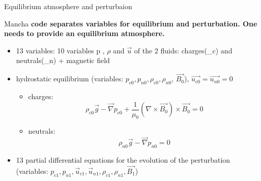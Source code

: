 \documentclass{beamer}
\begin{document}
\begin{frame}{Equilibrium atmosphere and perturbaion}


{\sc Mancha} {\bf code separates variables for equilibrium and perturbation. 
One needs to provide an equilibrium atmosphere.}


\begin{itemize}
\item 13 variables: 10 variables p , $\rho$ and $\vec{u}$ of the 2 fluids: charges(\_c) and neutrals(\_n) + magnetic field
\item hydrostatic equilibrium (variables: $p_{c0}, p_{n0}, \rho_{c0}, \rho_{n0}$, $\vec{B_0}$), $\vec{u_{c0}}=\vec{u_{n0}}=0$
 
\begin{itemize}
\item charges:
\begin{equation}
\rho_{c0}\vec{g} - \vec{\nabla} p_{c0} + \frac{1}{\mu_0} (\nabla \times \vec{B_0}) \times \vec{B_0} = 0
\end{equation}

\item neutrals:
\begin{equation}
\rho_{n0}\vec{g} - \vec{\nabla} p_{n0}  = 0
\end{equation}

\end{itemize}
\item 13 partial differential equations for the evolution of the perturbation (variables: $p_{c1},p_{n1}, \vec{u}_{c1},\vec{u}_{n1},\rho_{c1}, \rho_{n1}, \vec{B_1}$)

\end{itemize}

\end{frame}
\end{document}
